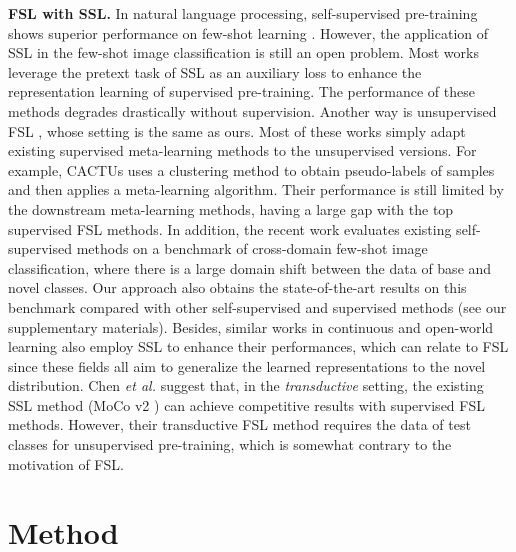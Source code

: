 \documentclass[runningheads]{llncs}
\begin{document}
\noindent\textbf{FSL with SSL.} In natural language processing, self-supervised pre-training shows superior performance on few-shot learning \cite{brown2020language}. However, the application of SSL in the few-shot image classification is still an open problem. Most works \cite{mangla2020charting,su2020when,gidaris2019boosting} leverage the pretext task of SSL as an auxiliary loss to enhance the representation learning of supervised pre-training. The performance of these methods degrades drastically without supervision. Another way is unsupervised 
FSL \cite{hsu2018unsupervised,khodadadeh2019unsupervised,Antoniou2020Assume,Qin2020ULDA,medina2020self,khodadadeh2021unsupervised,lee2021meta}, whose setting is the same as ours. Most of these works \cite{hsu2018unsupervised,khodadadeh2019unsupervised,Antoniou2020Assume,Qin2020ULDA,medina2020self,khodadadeh2021unsupervised} simply adapt existing supervised meta-learning methods to the unsupervised versions. For example, CACTUs \cite{hsu2018unsupervised} uses a clustering method to obtain pseudo-labels of samples and then applies a meta-learning algorithm. 
Their performance is still limited by the downstream meta-learning methods, having a large gap with the top supervised FSL methods.
In addition, the recent work \cite{ericsson2020how} evaluates existing self-supervised methods on a benchmark \cite{guo2020a} of cross-domain few-shot image classification, where there is a large domain shift between the data of base and novel classes. Our approach also obtains the state-of-the-art results on this benchmark \cite{guo2020a} compared with other self-supervised and supervised methods (see our supplementary materials).
Besides, similar works in continuous \cite{gallardo2021self} and open-world learning \cite{dhamija2021self} also employ SSL to enhance their performances, which can relate to FSL since these fields all aim to generalize the learned representations to the novel distribution.
Chen \emph{et al.} \cite{chen2021shot} suggest that, in the \textit{transductive} setting, the existing SSL method (MoCo v2 \cite{chen2020improved}) can achieve competitive results with supervised FSL methods. However, their transductive FSL method requires the data of test classes for unsupervised pre-training, which is somewhat contrary to the motivation of FSL.





\section{Method}
\end{document}
